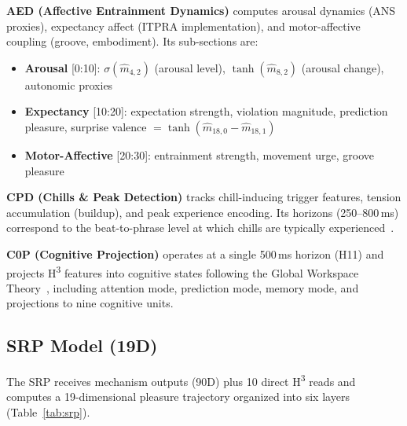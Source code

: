 \documentclass[10pt,twocolumn]{article}
\newcommand{\Htri}{H\textsuperscript{3}}
\newcommand{\sigmoid}{\sigma}
\begin{document}
\textbf{AED (Affective Entrainment Dynamics)} computes arousal dynamics (ANS proxies), expectancy affect (ITPRA implementation), and motor-affective coupling (groove, embodiment). Its sub-sections are:

\begin{itemize}
\item \textbf{Arousal} [0:10]: $\sigmoid(\hat{m}_{4,2})$ (arousal level), $\tanh(\hat{m}_{8,2})$ (arousal change), autonomic proxies
\item \textbf{Expectancy} [10:20]: expectation strength, violation magnitude, prediction pleasure, surprise valence $= \tanh(\hat{m}_{18,0} - \hat{m}_{18,1})$
\item \textbf{Motor-Affective} [20:30]: entrainment strength, movement urge, groove pleasure
\end{itemize}

\textbf{CPD (Chills \& Peak Detection)} tracks chill-inducing trigger features, tension accumulation (buildup), and peak experience encoding. Its horizons (250--800\,ms) correspond to the beat-to-phrase level at which chills are typically experienced~\cite{Sloboda1991,Guhn2007}.

\textbf{C0P (Cognitive Projection)} operates at a single 500\,ms horizon (H11) and projects \Htri{} features into cognitive states following the Global Workspace Theory~\cite{Baars1988}, including attention mode, prediction mode, memory mode, and projections to nine cognitive units.


\subsection{SRP Model (19D)}
\label{sec:srp}

The SRP receives mechanism outputs (90D) plus 10 direct \Htri{} reads and computes a 19-dimensional pleasure trajectory organized into six layers (Table~\ref{tab:srp}).
\end{document}
